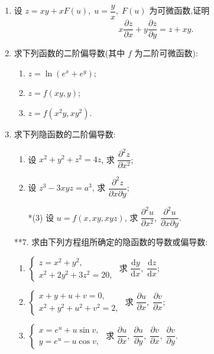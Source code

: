 \begin{enumerate}
    \item 设 $z=xy+xF(u),\;u=\dfrac{y}{x},\;F(u)$ 为可微函数,证明
    \[
        x\dfrac{\partial z}{\partial x}+y\dfrac{\partial z}{\partial y}=z+xy.
    \]

    \item 求下列函数的二阶偏导数(其中 $f$ 为二阶可微函数):
    \begin{enumerate}[(1)]\setlength{\itemsep}{5pt}\setlength{\topsep}{15pt}
        \item $z=\ln(e^x+e^y)$;
        \item $z=f(xy, y)$;
        \item $z=f(x^2y, xy^2)$.
    \end{enumerate}

    \item 求下列隐函数的二阶偏导数:
    \begin{enumerate}[(1)]\setlength{\itemsep}{5pt}\setlength{\topsep}{15pt}
        \item 设 $x^2+y^2+z^2=4z$, 求 $\dfrac{\partial^2z}{\partial x^2}$;
        \item 设 $z^3-3xyz=a^3$, 求 $\dfrac{\partial^2 z}{\partial x\partial y}$;
        \item[*(3)] 设 $u=f(x, xy, xyz)$, 求 $\dfrac{\partial^2 u}{\partial x^2},\;\dfrac{\partial^2u}{\partial x\partial y}$.
    \end{enumerate}

    \item[**7.] 求由下列方程组所确定的隐函数的导数或偏导数:
    \begin{enumerate}[(1)]\setlength{\itemsep}{5pt}\setlength{\topsep}{15pt}
        \item $\begin{cases}
            z=x^2+y^2,\\
            x^2+2y^2+3z^2=20,
        \end{cases}$
        求 $\dfrac{\text{d}y}{\text{d}x},\;\dfrac{\text{d}z}{\text{d}x}$;
        \item $\begin{cases}
            x+y+u+v=0,\\
            x^2+y^2+u^2+v^2=2,
        \end{cases}$
        求 $\dfrac{\partial u}{\partial x},\;\dfrac{\partial v}{\partial x}$;
        \item $\begin{cases}
            x=e^u+u\sin v,\\
            y=e^u-u\cos v,
        \end{cases}$
        求 $\dfrac{\partial u}{\partial x},\;\dfrac{\partial u}{\partial y},\;\dfrac{\partial v}{\partial x},\;\dfrac{\partial v}{\partial y}$.
    \end{enumerate} 


\end{enumerate}
